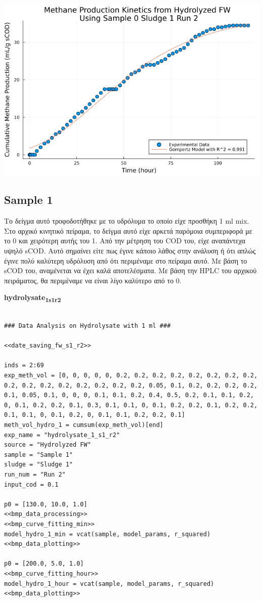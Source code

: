 \documentclass[11pt]{article}
\begin{document}
\begin{center}
\includegraphics[width=.9\linewidth]{../plots/BMPs/Hydrolyzed FW/methane_kinetics_hydrolysate_0_s1_r2_hour.png}
\end{center}

\subsection{Sample 1}
\label{sec:org3f4b3ad}
Το δείγμα αυτό τροφοδοτήθηκε με το υδρόλυμα το οποίο είχε προσθήκη 1 ml mix. Στο αρχικό κινητικό πείραμα, το δείγμα αυτό είχε αρκετά παρόμοια συμπεριφορά με το 0 και χειρότερη αυτής του 1. Από την μέτρηση του COD του, είχε αναπάντεχα υψηλό sCOD. Αυτό σημαίνει είτε πως έγινε κάποιο λάθος στην ανάλυση ή ότι απλώς έγινε πολύ καλύτερη υδρόλυση από ότι περιμέναμε στο πείραμα αυτό. Με βάση το sCOD του, αναμένεται να έχει καλά αποτελέσματα. Με βάση την HPLC του αρχικού πειράματος, θα περιμέναμε να είναι λίγο καλύτερο από το 0.

\textbf{hydrolysate\textsubscript{1}\textsubscript{s1}\textsubscript{r2}}
\begin{verbatim}

### Data Analysis on Hydrolysate with 1 ml ###

<<date_saving_fw_s1_r2>>

inds = 2:69
exp_meth_vol = [0, 0, 0, 0, 0, 0.2, 0.2, 0.2, 0.2, 0.2, 0.2, 0.2, 0.2, 0.2, 0.2, 0.2, 0.2, 0.2, 0.2, 0.2, 0.2, 0.05, 0.1, 0.2, 0.2, 0.2, 0.2, 0.1, 0.05, 0.1, 0, 0, 0, 0.1, 0.1, 0.2, 0.4, 0.5, 0.2, 0.1, 0.1, 0.2, 0, 0.1, 0.2, 0.2, 0.1, 0.3, 0.1, 0.1, 0, 0.1, 0.2, 0.2, 0.1, 0.2, 0.2, 0.1, 0.1, 0, 0.1, 0.2, 0, 0.1, 0.1, 0.2, 0.2, 0.1]
meth_vol_hydro_1 = cumsum(exp_meth_vol)[end]
exp_name = "hydrolysate_1_s1_r2"
source = "Hydrolyzed FW"
sample = "Sample 1"
sludge = "Sludge 1"
run_num = "Run 2"
input_cod = 0.1

p0 = [130.0, 10.0, 1.0]
<<bmp_data_processing>>
<<bmp_curve_fitting_min>>
model_hydro_1_min = vcat(sample, model_params, r_squared)
<<bmp_data_plotting>>

p0 = [200.0, 5.0, 1.0]
<<bmp_curve_fitting_hour>>
model_hydro_1_hour = vcat(sample, model_params, r_squared)
<<bmp_data_plotting>>
\end{verbatim}
\end{document}
